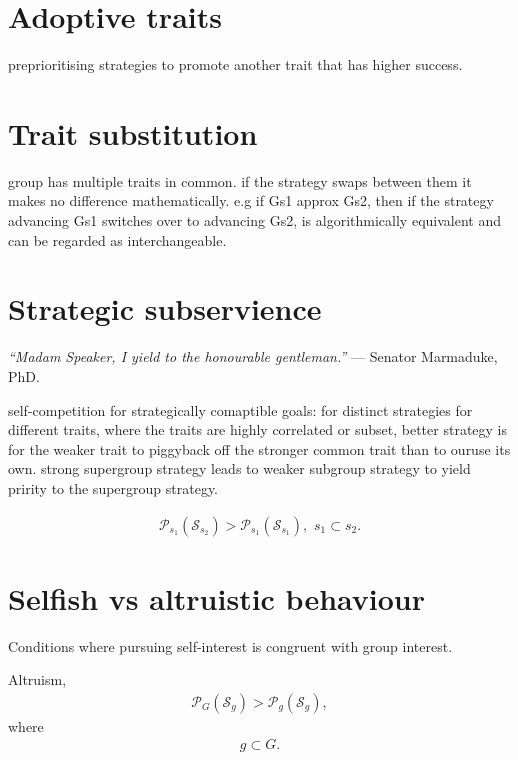 \documentclass[twocolumn, aps, rmp, amsmath, amssymb, nofootinbib, superscriptaddress, longbibliography, floatfix, table-of-contents, eqsecnum]{revtex4-1}
\newcommand{\famousquote}[2]{{\textit{``#1''} --- #2.}\newline}
\begin{document}
\section{Adoptive traits}

preprioritising strategies to promote another trait that has higher success.

\section{Trait substitution}

group has multiple traits in common. if the strategy swaps between them it makes no difference mathematically. e.g if Gs1 approx Gs2, then if the strategy advancing Gs1 switches over to advancing Gs2, is algorithmically equivalent and can be regarded as interchangeable.

\section{Strategic subservience}

\famousquote{Madam Speaker, I yield to the honourable gentleman.}{Senator Marmaduke, PhD}

self-competition for strategically comaptible goals:
for distinct strategies for different traits, where the traits are highly correlated or subset, better strategy is for the weaker trait to piggyback off the stronger common trait than to ouruse its own. strong supergroup strategy leads to weaker subgroup strategy to yield pririty to the supergroup strategy.

\begin{align}
\mathcal{P}_{s_1}(\mathcal{S}_{s_2}) > \mathcal{P}_{s_1}(\mathcal{S}_{s_1}), \,\,s_1\subset s_2.
\end{align}

\section{Selfish vs altruistic behaviour}

Conditions where pursuing self-interest is congruent with group interest.

Altruism,
\begin{align}
\mathcal{P}_G(\mathcal{S}_g) > \mathcal{P}_g(\mathcal{S}_g),
\end{align}
where
\begin{align}
	g \subset G.
\end{align}
\end{document}
